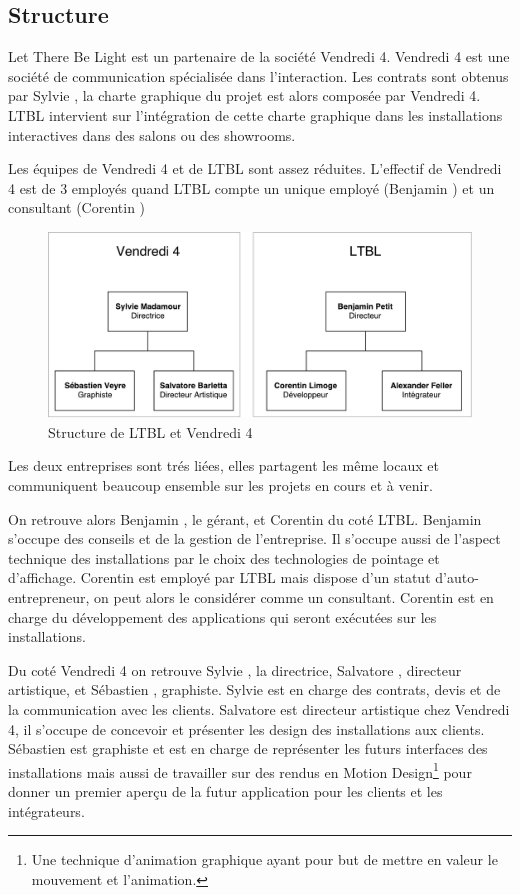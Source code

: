 \documentclass{article}
\begin{document}
\subsection{Structure}

Let There Be Light est un partenaire de la société Vendredi 4.
Vendredi 4 est une société de communication spécialisée dans l'interaction.
Les contrats sont obtenus par Sylvie , la charte graphique du projet est alors composée par Vendredi 4.
LTBL intervient sur l'intégration de cette charte graphique dans les installations interactives dans des salons ou des showrooms.

Les équipes de Vendredi 4 et de LTBL sont assez réduites.
L'effectif de Vendredi 4 est de 3 employés quand LTBL compte un unique employé (Benjamin ) et un consultant (Corentin )

\begin{figure}[h]
    \centering
    \includegraphics[scale=0.7]{Structure-LTBL.pdf}
    \caption{Structure de LTBL et Vendredi 4}
\end{figure}

Les deux entreprises sont trés liées, elles partagent les même locaux et communiquent beaucoup ensemble sur les projets en cours et à venir.

On retrouve alors Benjamin , le gérant, et Corentin  du coté LTBL.
Benjamin s'occupe des conseils et de la gestion de l'entreprise.
Il s'occupe aussi de l'aspect technique des installations par le choix des technologies de pointage et d'affichage.
Corentin est employé par LTBL mais dispose d'un statut d'auto-entrepreneur, on peut alors le considérer comme un consultant.
Corentin est en charge du développement des applications qui seront exécutées sur les installations.

Du coté Vendredi 4 on retrouve Sylvie , la directrice, Salvatore , directeur artistique, et Sébastien , graphiste.
Sylvie est en charge des contrats, devis et de la communication avec les clients.
Salvatore est directeur artistique chez Vendredi 4, il s'occupe de concevoir et présenter les design des installations aux clients.
Sébastien est graphiste et est en charge de représenter les futurs interfaces des installations mais aussi de travailler sur des rendus en Motion Design\footnote{Une technique d'animation graphique ayant pour but de mettre en valeur le mouvement et l'animation.} pour donner un premier aperçu de la futur application pour les clients et les intégrateurs.
\end{document}
